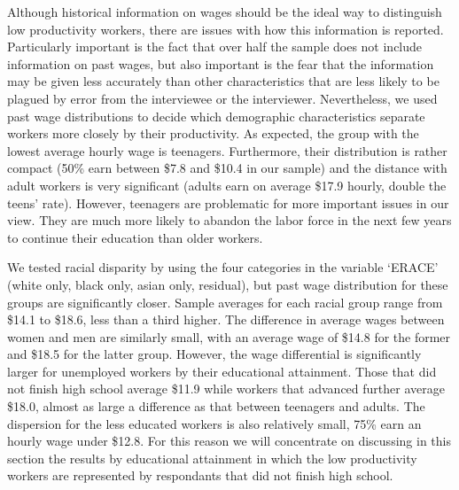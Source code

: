 \documentclass{article}
\begin{document}
Although historical information on wages should be the ideal way to distinguish low productivity workers, there are issues with how this information is reported. Particularly important is the fact that over half the sample does not include information on past wages, but also important is the fear that the information may be given less accurately than other characteristics that are less likely to be plagued by error from the interviewee or the interviewer. Nevertheless, we used past wage distributions to decide which demographic characteristics separate workers more closely by their productivity. As expected, the group with the lowest average hourly wage is teenagers. Furthermore, their distribution is rather compact (50\% earn between \$7.8 and \$10.4 in our sample) and the distance with adult workers is very significant (adults earn on average \$17.9 hourly, double the teens' rate). However, teenagers are problematic for more important issues in our view. They are much more likely to abandon the labor force in the next few years to continue their education than older workers.

We tested racial disparity by using the four categories in the variable `ERACE' (white only, black only, asian only, residual), but past wage distribution for these groups are significantly closer. Sample averages for each racial group range from \$14.1 to \$18.6, less than a third higher. The difference in average wages between women and men are similarly small, with an average wage of \$14.8 for the former and \$18.5 for the latter group. However, the wage differential is significantly larger for unemployed workers by their educational attainment. Those that did not finish high school average \$11.9 while workers that advanced further average \$18.0, almost as large a difference as that between teenagers and adults. The dispersion for the less educated workers is also relatively small, 75\% earn an hourly wage under \$12.8. For this reason we will concentrate on discussing in this section the results by educational attainment in which the low productivity workers are represented by respondants that did not finish high school.
\end{document}
